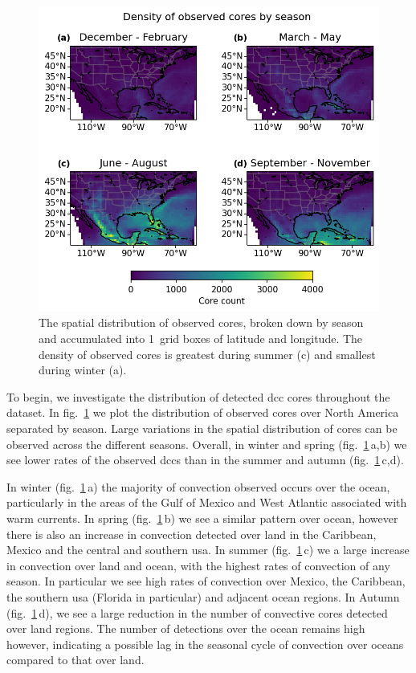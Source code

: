 \begin{figure}[tp]
    \centering
    \includegraphics[width=\textwidth]{figures/ch2_03.png}
    \caption[
    The spatial distribution of observed cores by season
    ]{
    The spatial distribution of observed cores, broken down by season and accumulated into 1\textdegree\ grid boxes of latitude and longitude. The density of observed cores is greatest during summer (c) and smallest during winter (a).
    }
    \label{fig:core_density_by_season}
\end{figure}

To begin, we investigate the distribution of detected \acrshort{dcc} cores throughout the dataset.
In fig.~\ref{fig:core_density_by_season} we plot the distribution of observed cores over North America separated by season.
Large variations in the spatial distribution of cores can be observed across the different seasons.
Overall, in winter and spring (fig.~\ref{fig:core_density_by_season}\,a,b) we see lower rates of the observed \acrshort{dcc}s than in the summer and autumn (fig.~\ref{fig:core_density_by_season}\,c,d).

In winter (fig.~\ref{fig:core_density_by_season}\,a) the majority of convection observed occurs over the ocean, particularly in the areas of the Gulf of Mexico and West Atlantic associated with warm currents.
In spring (fig.~\ref{fig:core_density_by_season}\,b) we see a similar pattern over ocean, however there is also an increase in convection detected over land in the Caribbean, Mexico and the central and southern \acrshort{usa}.
In summer (fig.~\ref{fig:core_density_by_season}\,c) we a large increase in convection over land and ocean, with the highest rates of convection of any season.
In particular we see high rates of convection over Mexico, the Caribbean, the southern \acrshort{usa} (Florida in particular) and adjacent ocean regions.
In Autumn (fig.~\ref{fig:core_density_by_season}\,d), we see a large reduction in the number of convective cores detected over land regions.
The number of detections over the ocean remains high however, indicating a possible lag in the seasonal cycle of convection over oceans compared to that over land.

